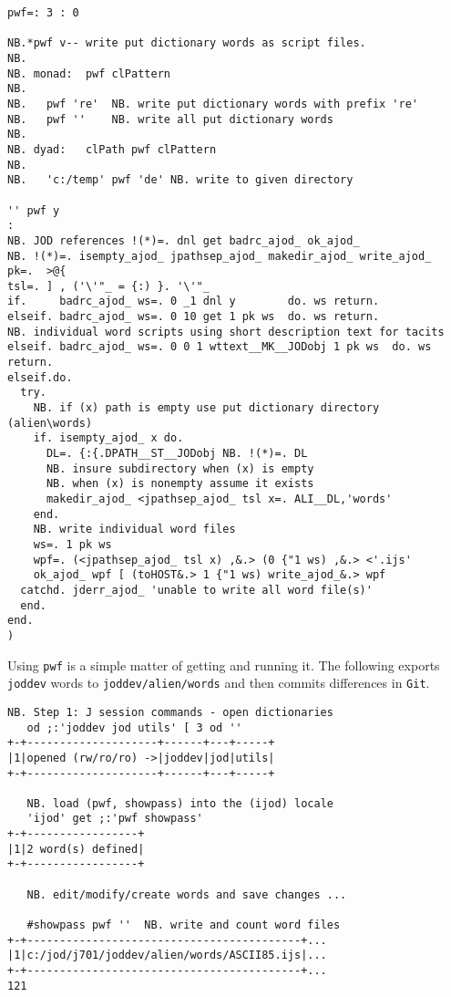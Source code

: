 \begin{enumerate}
\begin{lstlisting}[frame=single,framerule=0pt,basicstyle=\ttfamily\footnotesize]
pwf=: 3 : 0

NB.*pwf v-- write put dictionary words as script files.
NB.
NB. monad:  pwf clPattern
NB.
NB.   pwf 're'  NB. write put dictionary words with prefix 're'
NB.   pwf ''    NB. write all put dictionary words
NB.
NB. dyad:   clPath pwf clPattern
NB.
NB.   'c:/temp' pwf 'de' NB. write to given directory

'' pwf y
:
NB. JOD references !(*)=. dnl get badrc_ajod_ ok_ajod_ 
NB. !(*)=. isempty_ajod_ jpathsep_ajod_ makedir_ajod_ write_ajod_
pk=.  >@{                        
tsl=. ] , ('\'"_ = {:) }. '\'"_  
if.     badrc_ajod_ ws=. 0 _1 dnl y        do. ws return.
elseif. badrc_ajod_ ws=. 0 10 get 1 pk ws  do. ws return.
NB. individual word scripts using short description text for tacits
elseif. badrc_ajod_ ws=. 0 0 1 wttext__MK__JODobj 1 pk ws  do. ws return.
elseif.do.
  try.
    NB. if (x) path is empty use put dictionary directory (alien\words)
    if. isempty_ajod_ x do.
      DL=. {:{.DPATH__ST__JODobj NB. !(*)=. DL
      NB. insure subdirectory when (x) is empty 
      NB. when (x) is nonempty assume it exists
      makedir_ajod_ <jpathsep_ajod_ tsl x=. ALI__DL,'words'
    end.
    NB. write individual word files
    ws=. 1 pk ws
    wpf=. (<jpathsep_ajod_ tsl x) ,&.> (0 {"1 ws) ,&.> <'.ijs'
    ok_ajod_ wpf [ (toHOST&.> 1 {"1 ws) write_ajod_&.> wpf
  catchd. jderr_ajod_ 'unable to write all word file(s)'
  end.
end.
)
\end{lstlisting}

Using \texttt{pwf} is a simple matter of getting and running it.  The following
exports  \texttt{joddev} words  to \verb|joddev/alien/words| 
and then commits differences in \texttt{Git}.

\begin{lstlisting}[frame=single,framerule=0pt,basicstyle=\ttfamily\footnotesize]
   NB. Step 1: J session commands - open dictionaries
   od ;:'joddev jod utils' [ 3 od ''
+-+--------------------+------+---+-----+
|1|opened (rw/ro/ro) ->|joddev|jod|utils|
+-+--------------------+------+---+-----+

   NB. load (pwf, showpass) into the (ijod) locale
   'ijod' get ;:'pwf showpass'
+-+-----------------+
|1|2 word(s) defined|
+-+-----------------+

   NB. edit/modify/create words and save changes ...

   #showpass pwf ''  NB. write and count word files
+-+------------------------------------------+...
|1|c:/jod/j701/joddev/alien/words/ASCII85.ijs|...
+-+------------------------------------------+...
121
\end{lstlisting}


\end{enumerate}
